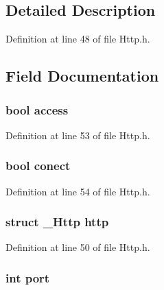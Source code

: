 \subsection{Detailed Description}


Definition at line 48 of file Http.\-h.



\subsection{Field Documentation}
\hypertarget{structHttpExtends_ab4e2372937bb1eec89f2a954a4db6604}{
\subsubsection[{access}]{\setlength{\rightskip}{0pt plus 5cm}bool access}}\label{structHttpExtends_ab4e2372937bb1eec89f2a954a4db6604}


Definition at line 53 of file Http.\-h.

\hypertarget{structHttpExtends_a506634736b4585cbeac7cbdefec1e540}{
\subsubsection[{conect}]{\setlength{\rightskip}{0pt plus 5cm}bool conect}}\label{structHttpExtends_a506634736b4585cbeac7cbdefec1e540}


Definition at line 54 of file Http.\-h.

\hypertarget{structHttpExtends_aac2793927d10867bce5b93fe1116b97b}{
\subsubsection[{http}]{\setlength{\rightskip}{0pt plus 5cm}struct {\bf \-\_\-\-Http} http}}\label{structHttpExtends_aac2793927d10867bce5b93fe1116b97b}


Definition at line 50 of file Http.\-h.

\hypertarget{structHttpExtends_a63c89c04d1feae07ca35558055155ffb}{
\subsubsection[{port}]{\setlength{\rightskip}{0pt plus 5cm}int port}}\label{structHttpExtends_a63c89c04d1feae07ca35558055155ffb}


